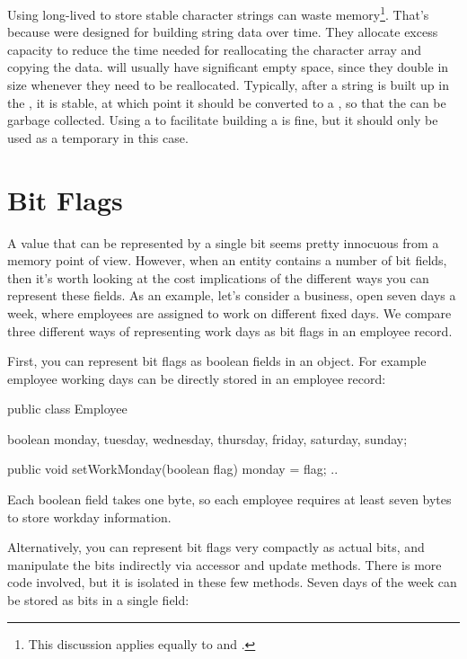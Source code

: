 Using long-lived  to store stable character strings 
can waste memory\footnote{This discussion
applies equally to  and .}. That's
because  were designed for building string data over time. They
allocate excess capacity to reduce the time needed for reallocating the
character array and copying the data.   will usually
have significant empty space, since they double in size whenever they need to be reallocated. 
Typically, after a string is built up in the , it is stable, at which point
it should be converted to a , so that the  can be
garbage collected. Using a  to facilitate
building a  is fine, but it should only be used as a temporary
in this case.

\section{Bit Flags}
\label{sec:bit-flags}

A value that can be represented by a single bit seems pretty innocuous from a
memory point of view. However, when an entity contains a number of bit
fields, then it's worth looking at the cost implications of
the different ways you can represent these fields. As an example, let's
consider a business, open seven days a week, where employees are 
assigned to work on different fixed days.  We compare three different ways of representing
work days as bit flags in an employee record.
 
First, you can represent bit flags as boolean fields in an object. For example
employee working days can be directly stored in an employee record:
\begin{shortlisting}

    public class Employee {
    	boolean monday, tuesday, wednesday, thursday, friday, saturday, sunday;
    	
    	public void setWorkMonday(boolean flag) {
    		monday = flag;
    	}
    	..
    }
    
\end{shortlisting}

Each boolean field takes one byte, so each employee requires at least seven
bytes to store workday information. 

Alternatively, you can represent bit flags very compactly as actual bits, and
manipulate the bits indirectly via accessor and update methods. There is more
code involved, but it is isolated in these few methods. Seven days of the week can be stored as
bits in a single  field:

